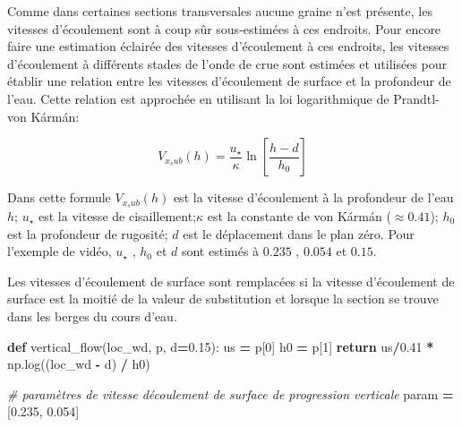\documentclass[
]{article}
\newenvironment{Shaded}{\begin{snugshade}}{\end{snugshade}}
\newcommand{\CommentTok}[1]{\textcolor[rgb]{0.56,0.35,0.01}{\textit{#1}}}
\newcommand{\ControlFlowTok}[1]{\textcolor[rgb]{0.13,0.29,0.53}{\textbf{#1}}}
\newcommand{\DecValTok}[1]{\textcolor[rgb]{0.00,0.00,0.81}{#1}}
\newcommand{\FloatTok}[1]{\textcolor[rgb]{0.00,0.00,0.81}{#1}}
\newcommand{\KeywordTok}[1]{\textcolor[rgb]{0.13,0.29,0.53}{\textbf{#1}}}
\newcommand{\NormalTok}[1]{#1}
\newcommand{\OperatorTok}[1]{\textcolor[rgb]{0.81,0.36,0.00}{\textbf{#1}}}
\begin{document}
Comme dans certaines sections transversales aucune graine n'est présente, les vitesses d'écoulement sont à coup sûr sous-estimées à ces endroits. Pour encore faire une estimation éclairée des vitesses d'écoulement à ces endroits, les vitesses d'écoulement à différents stades de l'onde de crue sont estimées et utilisées pour établir une relation entre les vitesses d'écoulement de surface et la profondeur de l'eau. Cette relation est approchée en utilisant la loi logarithmique de Prandtl-von Kármán:

\begin{equation}
V_{x_sub}(h) = \frac{u_{\star}}{\kappa} \ln\left[\frac{h - d}{h_0}\right]
\end{equation}

Dans cette formule \(V_{x_sub}(h)\) est la vitesse d'écoulement à la profondeur de l'eau \(h\); \(u_{\star}\) est la vitesse de cisaillement;\(\kappa\) est la constante de von Kármán (\(\approx 0.41\)); \(h_0\) est la profondeur de rugosité; \(d\) est le déplacement dans le plan zéro. Pour l'exemple de vidéo, \(u_{\star}\) , \(h_0\) et \(d\) sont estimés à \(0.235\) , \(0.054\) et \(0.15\).

Les vitesses d'écoulement de surface sont remplacées si la vitesse d'écoulement de surface est la moitié de la valeur de substitution et lorsque la section se trouve dans les berges du cours d'eau.

\begin{Shaded}
\begin{Highlighting}[]
\KeywordTok{def}\NormalTok{ vertical\_flow(loc\_wd, p, d}\OperatorTok{=}\FloatTok{0.15}\NormalTok{):}
\NormalTok{    us }\OperatorTok{=}\NormalTok{ p[}\DecValTok{0}\NormalTok{]}
\NormalTok{    h0 }\OperatorTok{=}\NormalTok{ p[}\DecValTok{1}\NormalTok{]}
    \ControlFlowTok{return}\NormalTok{ us}\OperatorTok{/}\FloatTok{0.41} \OperatorTok{*}\NormalTok{ np.log((loc\_wd }\OperatorTok{{-}}\NormalTok{ d) }\OperatorTok{/}\NormalTok{ h0)}

\CommentTok{\# paramètres de vitesse d\textquotesingle{}écoulement de surface de progression verticale}
\NormalTok{param }\OperatorTok{=}\NormalTok{ [}\FloatTok{0.235}\NormalTok{, }\FloatTok{0.054}\NormalTok{]}
\end{Highlighting}
\end{Shaded}
\end{document}
